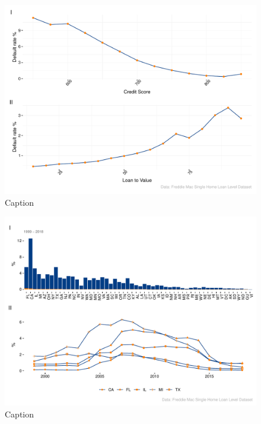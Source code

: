 \begin{figure}
    \centering
    \includegraphics[width = \textwidth]{Figures/pw_2.pdf}
    \caption{Caption}
    \label{fig:my_label}
\end{figure}

\begin{figure}
    \centering
    \includegraphics[width = \textwidth]{Figures/pw_3.pdf}
    \caption{Caption}
    \label{fig:my_label}
\end{figure}

